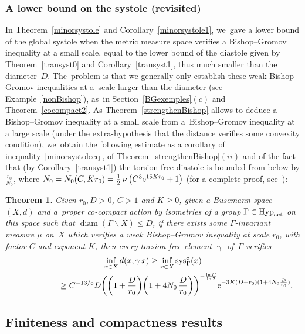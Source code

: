 \documentclass[pdftex]{sigma}
\numberwithin{equation}{section}
\newtheorem{theor}{Theorem}[section]
\newcommand{\sys}{\operatorname{sys}}
\newcommand{\diam}{\operatorname{diam}}
\newcommand{\g}{\operatorname{\gamma}}
\begin{document}
\subsubsection{A lower bound on the systole (revisited)}%

In Theorem~\ref{minorsystole} and Corollary~\ref{minorsystole1}, we~gave a lower bound of the global systole when the metric measure space verifies a
Bishop--Gromov inequality at a small scale, equal to the lower bound of the diastole given by Theorem~\ref{transyst0} and Corollary~\ref{transyst1}, thus
much smaller than the diameter~$D$. The~problem is that we generally only
establish these weak Bishop--Gromov ineq\-ualities at a~scale larger than the
diameter (see Example~\ref{nonBishop}), as~in Section~\ref{BGexemples}$(c)$ and Theorem~\ref{cocompact2}. As Theo\-rem~\ref{strengthenBishop} allows to deduce a Bishop--Gromov inequality at a small scale from
a~Bishop--Gromov inequality at a large scale (under the extra-hypothesis that the distance verifies some convexity condition), we~obtain the following estimate
as a corollary of inequality~\eqref{minorsystoleeq}, of Theo\-rem~\ref{strengthenBishop}$(ii)$ and of the fact that (by Corollary~\ref{transyst1}) the torsion-free diastole is bounded from below by $\frac{r_0}{N_0}$,
where $N_0 = N_0 (C, Kr_0)= \frac{1}{2} \,\nu \left(C^3 {\rm e}^{15 K r_0} + 1\right)$ (for a complete proof, see~\cite{BCGS2}):

\begin{theor}\label{minorsystole5}
{\sloppy
Given $r_0, D >0$, $C > 1 $ and $K\ge 0$, given a Busemann space $(X,d)$
and a~proper co-compact action by isometries of a group
$\Gamma \in \text{\rm Hyp}_{\rm act}$ on this space such that $\diam (\Gamma \backslash X) \le D$, if there exists some
$\Gamma$-invariant measure $\mu$ on~$X$ which verifies a weak Bishop--Gromov inequality at scale $r_0$, with factor $C$ and exponent $K$, then every torsion-free element $\g$ of~$\Gamma$ verifies
\begin{gather*}
\inf_{x \in X} d(x, \g x) \ge \inf_{x \in X} \sys^{\diamond}_\Gamma (x)
\\ \hphantom{\inf_{x \in X} d(x, \g x) }
{}\ge C^{-13/5} D \bigg(\bigg(1 + \frac{D}{r_0}\bigg) \bigg(1 + 4 N_0\,\frac{D}{r_0}\bigg)\bigg)^{-\frac{\ln C}{\ln 2}} {\rm e}^{ - 3 K (D+ r_0) ( 1 + 4 N_0 \frac{D}{r_0})}.
\end{gather*}}
\end{theor}

\subsection{Finiteness and compactness results}\label{finicompact}
\end{document}
